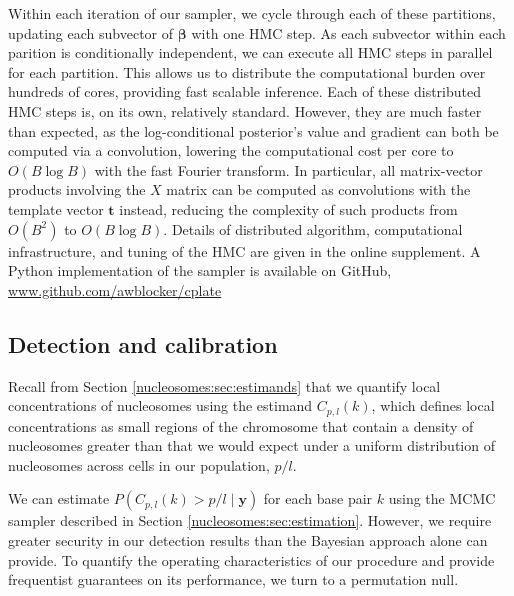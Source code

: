 Within each iteration of our sampler, we cycle through each of these partitions, updating each subvector of $\bm \beta$ with one HMC step.
As each subvector within each parition is conditionally independent, we can execute all HMC steps in parallel for each partition.
This allows us to distribute the computational burden over hundreds of cores, providing fast scalable inference.
Each of these distributed HMC steps is, on its own, relatively standard.
However, they are much faster than expected, as the log-conditional posterior's value and gradient can both be computed via a convolution, lowering the computational cost per core to $O(B \log B)$ with the fast Fourier transform. 
In particular, all matrix-vector products involving the $X$ matrix can be computed as convolutions with the template vector $\bm t$ instead, reducing the complexity of such products from $O(B^2)$ to $O(B \log B)$.
Details of distributed algorithm, computational infrastructure, and tuning of the HMC are given in the online supplement. %
A Python implementation of the sampler is available on GitHub, \url{www.github.com/awblocker/cplate}	

\subsection{Detection and calibration}
\label{nucleosomes:sec:detection}

Recall from Section \ref{nucleosomes:sec:estimands} that we quantify  local concentrations of nucleosomes using the estimand $C_{p,l}(k)$, which defines local concentrations as small regions of the chromosome that contain a density of nucleosomes greater than that we would expect under a uniform distribution of nucleosomes across cells in our population, $p / l$.

We can estimate $P(C_{p,l}(k) > p / l \mid \bm y)$ for each base pair $k$ using the MCMC sampler described in Section \ref{nucleosomes:sec:estimation}.
However, we require greater security in our detection results than the Bayesian approach alone can provide.
To quantify the operating characteristics of our procedure and provide frequentist guarantees on its performance, we turn to a permutation null.

